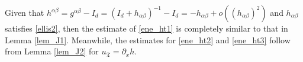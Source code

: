\documentclass[11pt,letterpaper,reqno]{amsart}
\numberwithin{equation}{section}
\theoremstyle{definition}
\theoremstyle{remark}
\begin{document}
Given that $ h^{\alpha \beta} =g^{\alpha \beta} -I_d= (I_d+h_{\alpha\beta})^{-1}-I_d = -h_{\alpha\beta}+o((h_{\alpha\beta})^2)$ and $ h_{\alpha \beta} $ satisfies \eqref{ellis2}, then the estimate of 	\eqref{ene_ht1} is completely similar to that in Lemma \ref{lem_J1}.  Meanwhile, the estimates for \eqref{ene_ht2} and \eqref{ene_ht3} follow from Lemma \ref{lem_J2} for $u_{\mathfrak{T}}= \partial_x h.$


\end{document}
